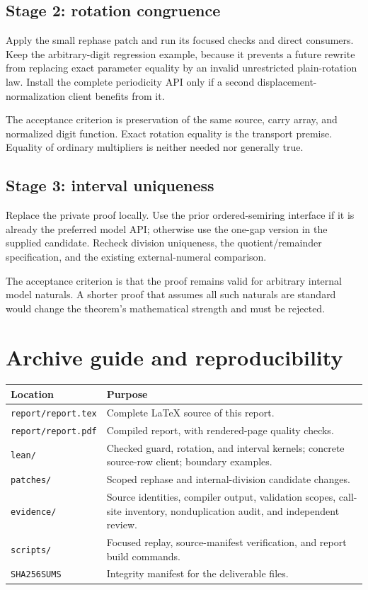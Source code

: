 \documentclass[11pt,letterpaper]{article}
\newcommand{\code}[1]{{\small\urlstyle{tt}\nolinkurl{#1}}}
\begin{document}
\subsection{Stage 2: rotation congruence}

Apply the small rephase patch and run its focused checks and direct consumers. Keep the arbitrary-digit regression example, because it prevents a future rewrite from replacing exact parameter equality by an invalid unrestricted plain-rotation law. Install the complete periodicity API only if a second displacement-normalization client benefits from it.

The acceptance criterion is preservation of the same source, carry array, and normalized digit function. Exact rotation equality is the transport premise. Equality of ordinary multipliers is neither needed nor generally true.

\subsection{Stage 3: interval uniqueness}

Replace the private proof locally. Use the prior ordered-semiring interface if it is already the preferred model API; otherwise use the one-gap version in the supplied candidate. Recheck division uniqueness, the quotient/remainder specification, and the existing external-numeral comparison.

The acceptance criterion is that the proof remains valid for arbitrary internal model naturals. A shorter proof that assumes all such naturals are standard would change the theorem's mathematical strength and must be rejected.

\section{Archive guide and reproducibility}

\begin{tabularx}{\textwidth}{@{}p{}X@{}}
\toprule
Location & Purpose\\
\midrule
\code{report/report.tex} & Complete LaTeX source of this report.\\
\code{report/report.pdf} & Compiled report, with rendered-page quality checks.\\
\code{lean/} & Checked guard, rotation, and interval kernels; concrete source-row client; boundary examples.\\
\code{patches/} & Scoped rephase and internal-division candidate changes.\\
\code{evidence/} & Source identities, compiler output, validation scopes, call-site inventory, nonduplication audit, and independent review.\\
\code{scripts/} & Focused replay, source-manifest verification, and report build commands.\\
\code{SHA256SUMS} & Integrity manifest for the deliverable files.\\
\bottomrule
\end{tabularx}
\end{document}
